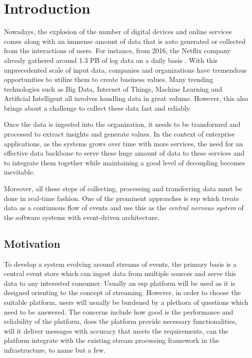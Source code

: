 \chapter{Introduction} \label{chap:intro}
Nowadays, the explosion of the number of digital devices and online services comes along with an immense amount of data that is auto generated or collected from the interactions of users. For instance, from 2016, the Netflix company already gathered around 1.3 PB of log data on a daily basis \cite{netflixpipeline}. With this unprecedented scale of input data, companies and organizations have tremendous opportunities to utilize them to create business values. Many trending technologies such as Big Data, Internet of Things, Machine Learning and Artificial Intelligent all involves handling data in great volume. However, this also brings about a challenge to collect these data fast and reliably.
 

Once the data is ingested into the organization, it needs to be transformed  and processed to extract insights and generate values. In the context of enterprise applications, as the systems grows over time with more services, the need for an effective data backbone to serve these huge amount of data to these services and to integrate them together while maintaining a good level of decoupling becomes inevitable.

Moreover, all these steps of collecting, processing and transferring data must be done in real-time fashion. One of the prominent approaches is \acrfull{esp} which treats data as a continuous flow of events and use this as the \emph{central nervous system} of the software systems with event-driven architecture.
 
\section{Motivation}
To develop a system evolving around streams of events, the primary basis is a central event store which can ingest data from multiple sources and serve this data to any interested consumer. Usually an \acrshort{esp} platform will be used as it is designed orienting to the concept of streaming. However, in order to choose the suitable platform, users will usually be burdened by a plethora of questions which need to be answered. The concerns include how good is the performance and reliability of the platform, does the platform provide necessary functionalities, will it deliver messages with accuracy that meets the requirements, can the platform integrate with the existing stream processing framework in the infrastructure, to name but a few.

